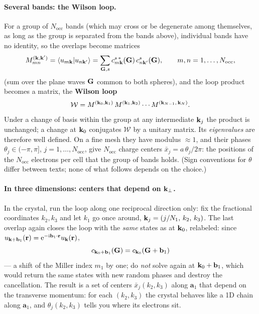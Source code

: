 \paragraph{Several bands: the Wilson loop.} For a group of $N_{\mathrm{occ}}$
bands (which may cross or be degenerate among themselves, as long as the
group is separated from the bands above), individual bands have no
identity, so the overlaps become matrices
\begin{equation}
M^{(\mathbf{k},\mathbf{k}')}_{mn} = \braket{u_{m\mathbf{k}}|u_{n\mathbf{k}'}}
= \sum_{\mathbf{G},s} c^{s\,*}_{m\mathbf{k}}(\mathbf{G})\, c^{s}_{n\mathbf{k}'}(\mathbf{G}),
\qquad m,n = 1,\dots,N_{\mathrm{occ}},
\label{eq:overlapM}
\end{equation}
(sum over the plane waves $\mathbf{G}$ common to both spheres), and the loop
product becomes a matrix, the \textbf{Wilson loop}
\begin{equation}
\mathcal W = M^{(\mathbf{k}_0,\mathbf{k}_1)}\, M^{(\mathbf{k}_1,\mathbf{k}_2)} \cdots
M^{(\mathbf{k}_{N-1},\,\mathbf{k}_N)} .
\label{eq:wilson}
\end{equation}
Under a change of basis within the group at any intermediate $\mathbf{k}_j$ the
product is unchanged; a change at $\mathbf{k}_0$ conjugates $\mathcal W$ by a
unitary matrix. Its \emph{eigenvalues} are therefore well defined. On a
fine mesh they have modulus $\approx 1$, and their phases
$\theta_j \in (-\pi,\pi]$, $j = 1,\dots,N_{\mathrm{occ}}$, give
$N_{\mathrm{occ}}$ charge centers $\bar x_j = a\,\theta_j/2\pi$: the
positions of the $N_{\mathrm{occ}}$ electrons per cell that the group of
bands holds. (Sign conventions for $\theta$ differ between texts; none of
what follows depends on the choice.)

\paragraph{In three dimensions: centers that depend on $\mathbf{k}_\perp$.} In
the crystal, run the loop along one reciprocal direction only: fix the
fractional coordinates $k_2, k_3$ and let $k_1$ go once around,
$\mathbf{k}_j = (j/N_1,\,k_2,\,k_3)$. The last overlap again closes the loop with
the \emph{same} states as at $\mathbf{k}_0$, relabeled: since
$u_{\mathbf{k}+\mathbf b_1}(\mathbf{r}) = \mathrm{e}^{-\mathrm{i}\mathbf b_1\cdot\mathbf{r}}u_{\mathbf{k}}(\mathbf{r})$,
\begin{equation}
c_{\mathbf{k}_0+\mathbf b_1}(\mathbf{G}) = c_{\mathbf{k}_0}(\mathbf{G} + \mathbf b_1)
\label{eq:closure}
\end{equation}
--- a shift of the Miller index $m_1$ by one; do \emph{not} solve again at
$\mathbf{k}_0 + \mathbf b_1$, which would return the same states with new random
phases and destroy the cancellation. The result is a set of centers
$\bar x_j(k_2,k_3)$ along $\mathbf a_1$ that depend on the transverse
momentum: for each $(k_2,k_3)$ the crystal behaves like a 1D chain along
$\mathbf a_1$, and $\theta_j(k_2,k_3)$ tells you where its electrons sit.

